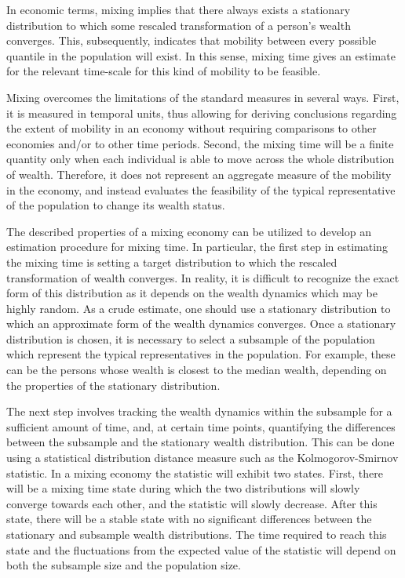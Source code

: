 \documentclass[11pt]{article}
\numberwithin{equation}{section}
\begin{document}
In economic terms, mixing implies that there always exists a stationary distribution to which some rescaled transformation of a person's wealth converges. This, subsequently, indicates that mobility between every possible quantile in the population will exist. In this sense, mixing time gives an estimate for the relevant time-scale for this kind of mobility to be feasible.

Mixing overcomes the limitations of the standard measures in several ways. First, it is measured in temporal units, thus allowing for deriving conclusions regarding the extent of mobility in an economy without requiring comparisons to other economies and/or to other time periods. Second, the mixing time will be a finite quantity only when each individual is able to move across the whole distribution of wealth. Therefore, it does not represent an aggregate measure of the mobility in the economy, and instead evaluates the feasibility of the typical representative of the population to change its wealth status.

The described properties of a mixing economy can be utilized to develop an estimation procedure for mixing time. In particular, the first step in estimating the mixing time is setting a target distribution to which the rescaled transformation of wealth converges. In reality, it is difficult to recognize the exact form of this distribution as it depends on the wealth dynamics which may be highly random. As a crude estimate, one should use a stationary distribution to which an approximate form of the wealth dynamics converges. Once a stationary distribution is chosen, it is necessary to select a subsample of the population which represent the typical representatives in the population. For example, these can be the persons whose wealth is closest to the median wealth, depending on the properties of the stationary distribution.

The next step involves tracking the wealth dynamics within the subsample for a sufficient amount of time, and, at certain time points, quantifying the differences between the subsample and the stationary wealth distribution. This can be done using a statistical distribution distance measure such as the Kolmogorov-Smirnov statistic. In a mixing economy the statistic will exhibit two states.  First, there will be a mixing time state during which the two distributions will slowly converge towards each other, and the statistic will slowly decrease. After this state, there will be a stable state with no significant differences between the stationary and subsample wealth distributions. The time required to reach this state and the fluctuations from the expected value of the statistic will depend on both the subsample size and the population size.
\end{document}
